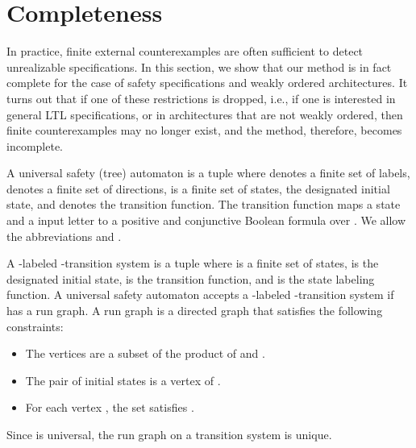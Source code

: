 \documentclass{LMCS}
\theoremstyle{plain}\newtheorem{theorem}[thm]{Theorem}
\theoremstyle{plain}\newtheorem{lemma}[thm]{Lemma}
\theoremstyle{plain}\newtheorem{proposition}[thm]{Proposition}
\theoremstyle{plain}\newtheorem{corollary}[thm]{Corollary}
\theoremstyle{definition}\newtheorem{definition}{Definition}[section]
\begin{document}
\begin{comment}
  \node[above of=tree3] {(1,3)};

\end{tikzpicture} \caption[]{Path selection for counter example when assuming that all correct nodes use the identity input-output encoding}
\label{fig:byzantine_path_selection}
\end{figure}
\end{comment}

\section{Completeness} \label{sec:completeness}


In practice, finite external counterexamples are often sufficient to detect unrealizable specifications. In this section, we show that our method is in fact complete for the case of safety specifications and weakly ordered architectures. 
It turns out that if one of these restrictions is dropped, i.e., if one is interested in general LTL specifications, or in architectures that are not weakly ordered, then finite counterexamples may no longer exist, and the method, therefore, becomes incomplete.



A universal safety (tree) automaton is a tuple  where  denotes a finite set of labels,  denotes a finite set of directions,  is a finite set of states,  the designated initial state, and  denotes the transition function.
The transition function  maps a state and a input letter to a positive and conjunctive Boolean formula over .
We allow the abbreviations  and .

A -labeled -transition system is a tuple  where  is a finite set of states,  is the designated initial state,  is the transition function, and  is the state labeling function.
A universal safety automaton accepts a -labeled -transition system  if  has a run graph.
A run graph is a directed graph  that satisfies the following constraints:
\begin{itemize}
  \item The vertices  are a subset of the product of  and .
  \item The pair of initial states  is a vertex of .
  \item For each vertex , the set  satisfies .
\end{itemize}
Since  is universal, the run graph on a transition system is unique.
\end{document}
